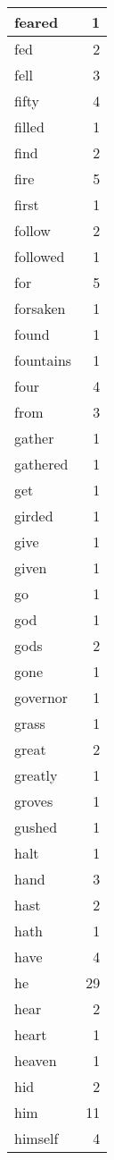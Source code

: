 \begin{center}
\begin{longtable}{l|r}
feared & 1\\ \hline 
fed & 2\\ \hline 
fell & 3\\ \hline 
fifty & 4\\ \hline 
filled & 1\\ \hline 
find & 2\\ \hline 
fire & 5\\ \hline 
first & 1\\ \hline 
follow & 2\\ \hline 
followed & 1\\ \hline 
for & 5\\ \hline 
forsaken & 1\\ \hline 
found & 1\\ \hline 
fountains & 1\\ \hline 
four & 4\\ \hline 
from & 3\\ \hline 
gather & 1\\ \hline 
gathered & 1\\ \hline 
get & 1\\ \hline 
girded & 1\\ \hline 
give & 1\\ \hline 
given & 1\\ \hline 
go & 1\\ \hline 
god & 1\\ \hline 
gods & 2\\ \hline 
gone & 1\\ \hline 
governor & 1\\ \hline 
grass & 1\\ \hline 
great & 2\\ \hline 
greatly & 1\\ \hline 
groves & 1\\ \hline 
gushed & 1\\ \hline 
halt & 1\\ \hline 
hand & 3\\ \hline 
hast & 2\\ \hline 
hath & 1\\ \hline 
have & 4\\ \hline 
he & 29\\ \hline 
hear & 2\\ \hline 
heart & 1\\ \hline 
heaven & 1\\ \hline 
hid & 2\\ \hline 
him & 11\\ \hline 
himself & 4\\ \hline 

\end{longtable}
\end{center}
